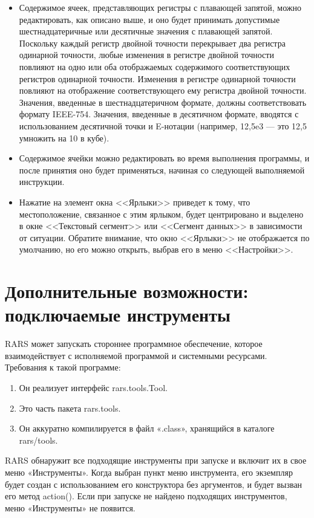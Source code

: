 \begin{itemize}
    \item Содержимое ячеек, представляющих регистры с плавающей запятой, можно редактировать, как описано выше, и оно будет принимать допустимые шестнадцатеричные или десятичные значения с плавающей запятой. Поскольку каждый регистр двойной точности перекрывает два регистра одинарной точности, любые изменения в регистре двойной точности повлияют на одно или оба отображаемых содержимого соответствующих регистров одинарной точности. Изменения в регистре одинарной точности повлияют на отображение соответствующего ему регистра двойной точности. Значения, введенные в шестнадцатеричном формате, должны соответствовать формату IEEE-754. Значения, введенные в десятичном формате, вводятся с использованием десятичной точки и E-нотации (например, 12,5e3 — это 12,5 умножить на 10 в кубе).
    \item Содержимое ячейки можно редактировать во время выполнения программы, и после принятия оно будет применяться, начиная со следующей выполняемой инструкции.
    \item Нажатие на элемент окна <<Ярлыки>> приведет к тому, что местоположение, связанное с этим ярлыком, будет центрировано и выделено в окне <<Текстовый сегмент>> или <<Сегмент данных>> в зависимости от ситуации. Обратите внимание, что окно <<Ярлыки>> не отображается по умолчанию, но его можно открыть, выбрав его в меню <<Настройки>>.
\end{itemize}

\section{Дополнительные возможности: подключаемые инструменты}

RARS может запускать стороннее программное обеспечение, которое взаимодействует с исполняемой программой и системными ресурсами. Требования к такой программе:
\begin{enumerate}
    \item Он реализует интерфейс rars.tools.Tool.
    \item Это часть пакета rars.tools.
    \item Он аккуратно компилируется в файл «.class», хранящийся в каталоге rars/tools.
\end{enumerate}
RARS обнаружит все подходящие инструменты при запуске и включит их в свое меню «Инструменты». Когда выбран пункт меню инструмента, его экземпляр будет создан с использованием его конструктора без аргументов, и будет вызван его метод action(). Если при запуске не найдено подходящих инструментов, меню «Инструменты» не появится.

